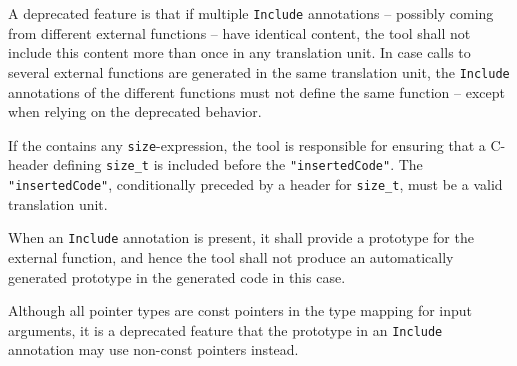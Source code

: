 \begin{annotationdefinition}[Include]
\begin{semantics}
A deprecated feature is that if multiple \lstinline!Include! annotations -- possibly coming from different external functions -- have identical content, the tool shall not include this content more than once in any translation unit.
In case calls to several external functions are generated in the same translation unit, the \lstinline!Include! annotations of the different functions must not define the same function -- except when relying on the deprecated behavior.

If the  contains any \lstinline!size!-expression, the tool is responsible for ensuring that a C-header defining \lstinline[language=C]!size_t! is included before the \lstinline!"insertedCode"!.
The \lstinline!"insertedCode"!, conditionally preceded by a header for \lstinline[language=C]!size_t!, must be a valid translation unit.

When an \lstinline!Include! annotation is present, it shall provide a prototype for the external function, and hence the tool shall not produce an automatically generated prototype in the generated code in this case.

Although all pointer types are const pointers in the type mapping for input arguments, it is a deprecated feature that the prototype in an \lstinline!Include! annotation may use non-const pointers instead.


\end{semantics}
\end{annotationdefinition}
